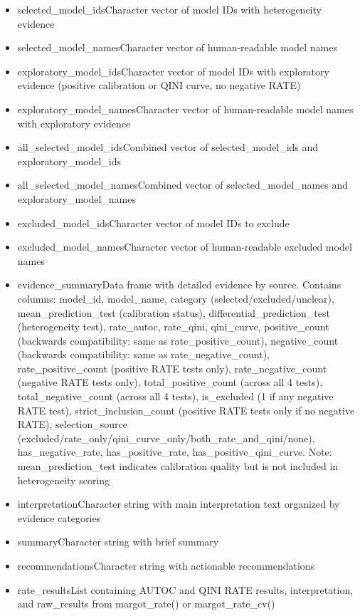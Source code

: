 \documentclass[a4paper]{book}
\begin{document}
\begin{Arguments}
\begin{itemize}
\item{} selected\_model\_idsCharacter vector of model IDs with heterogeneity evidence
\item{} selected\_model\_namesCharacter vector of human-readable model names
\item{} exploratory\_model\_idsCharacter vector of model IDs with exploratory evidence (positive calibration or QINI curve, no negative RATE)
\item{} exploratory\_model\_namesCharacter vector of human-readable model names with exploratory evidence
\item{} all\_selected\_model\_idsCombined vector of selected\_model\_ids and exploratory\_model\_ids
\item{} all\_selected\_model\_namesCombined vector of selected\_model\_names and exploratory\_model\_names
\item{} excluded\_model\_idsCharacter vector of model IDs to exclude
\item{} excluded\_model\_namesCharacter vector of human-readable excluded model names
\item{} evidence\_summaryData frame with detailed evidence by source. Contains columns: model\_id, model\_name, category (selected/excluded/unclear), mean\_prediction\_test (calibration status), differential\_prediction\_test (heterogeneity test), rate\_autoc, rate\_qini, qini\_curve, positive\_count (backwards compatibility: same as rate\_positive\_count), negative\_count (backwards compatibility: same as rate\_negative\_count), rate\_positive\_count (positive RATE tests only), rate\_negative\_count (negative RATE tests only), total\_positive\_count (across all 4 tests), total\_negative\_count (across all 4 tests), is\_excluded (1 if any negative RATE test), strict\_inclusion\_count (positive RATE tests only if no negative RATE), selection\_source (excluded/rate\_only/qini\_curve\_only/both\_rate\_and\_qini/none), has\_negative\_rate, has\_positive\_rate, has\_positive\_qini\_curve. Note: mean\_prediction\_test indicates calibration quality but is not included in heterogeneity scoring
\item{} interpretationCharacter string with main interpretation text organized by evidence categories
\item{} summaryCharacter string with brief summary
\item{} recommendationsCharacter string with actionable recommendations
\item{} rate\_resultsList containing AUTOC and QINI RATE results, interpretation, and raw\_results from margot\_rate() or margot\_rate\_cv()

\end{itemize}
\end{Arguments}
\end{document}
